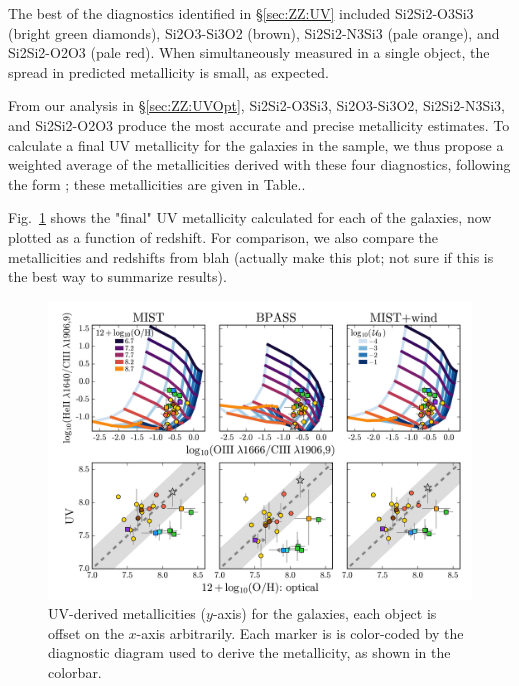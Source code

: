 The best of the diagnostics identified in \S\ref{sec:ZZ:UV} included Si2Si2-O3Si3 (bright green diamonds), Si2O3-Si3O2 (brown), Si2Si2-N3Si3 (pale orange), and Si2Si2-O2O3 (pale red). When simultaneously measured in a single object, the spread in predicted metallicity is small, as expected.

From our analysis in \S\ref{sec:ZZ:UVOpt}, Si2Si2-O3Si3, Si2O3-Si3O2, Si2Si2-N3Si3, and Si2Si2-O2O3 produce the most accurate and precise metallicity estimates. To calculate a final UV metallicity for the galaxies in the \mage sample, we thus propose a weighted average of the metallicities derived with these four diagnostics, following the form \XXX; these metallicities are given in Table.\XXX.

Fig.~\ref{fig:UVmage} shows the "final" UV metallicity calculated for each of the \mage galaxies, now plotted as a function of redshift. For comparison, we also compare the metallicities and redshifts from blah (\XXX actually make this plot; not sure if this is the best way to summarize results).

\begin{figure}
  \begin{center}
    \includegraphics[width=\linewidth]{figs/f8.png}
    \caption{UV-derived metallicities ($y$-axis) for the \mage galaxies, each object is offset on the $x$-axis arbitrarily. Each marker is is color-coded by the diagnostic diagram used to derive the metallicity, as shown in the colorbar. }
    \label{fig:UVmage}
  \end{center}
\end{figure}



